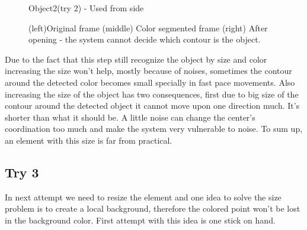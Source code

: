 \begin{figure}
	\caption{Object2(try 2) - Used from side}  
\end{figure}
\begin{figure}
\caption{(left)Original frame (middle) Color segmented frame (right) After opening - the system cannot decide which contour is the object.}
\end{figure}
Due to the fact that this step still recognize the object by size and color increasing the size won't help, mostly because of noises, sometimes the contour around the detected color becomes small specially in fast pace movements. Also increasing the size of the object has two consequences, first due to big size of the contour around the detected object it cannot move upon one direction much. It's shorter than what it should be. A little noise can change the center's coordination too much and make the system very vulnerable to noise. To sum up, an element with this size is far from practical. 
\subsection{Try 3}
In next attempt we need to resize the element and one idea to solve the size problem is to create a local background, therefore the colored point won't be lost in the background color. First attempt with this idea is one stick on hand. \newline

